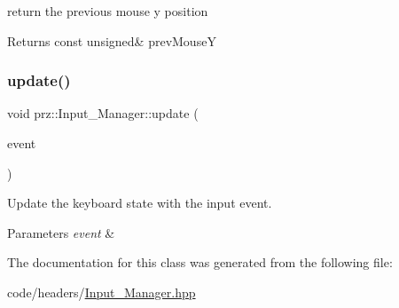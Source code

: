 return the previous mouse y position 

\begin{DoxyReturn}{Returns}
const unsigned\& prev\+MouseY 
\end{DoxyReturn}
\mbox{\label{classprz_1_1_input___manager_a4d1defd273c14ac8fd242514a95de019}} 
\subsubsection{\texorpdfstring{update()}{update()}}
{\footnotesize\ttfamily void prz\+::\+Input\+\_\+\+Manager\+::update (\begin{DoxyParamCaption}\item[{Event \&}]{event }\end{DoxyParamCaption})\hspace{0.3cm}{\ttfamily [inline]}}



Update the keyboard state with the input event. 


\begin{DoxyParams}{Parameters}
{\em event} & \\
\hline
\end{DoxyParams}


The documentation for this class was generated from the following file\+:\begin{DoxyCompactItemize}
\item 
code/headers/\mbox{\hyperlink{_input___manager_8hpp}{Input\+\_\+\+Manager.\+hpp}}\end{DoxyCompactItemize}
